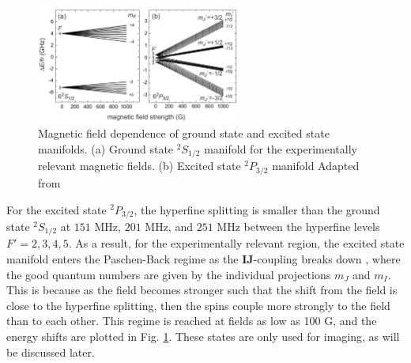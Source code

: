 \documentclass[prl,onecolumn,amsmath,amssymb,titlepage,nofootinbib,preprint]{revtex4-1}
\begin{document}

\begin{figure}
	\includegraphics[width=0.6\textwidth]{Figures/Zeeman_splitting}
	\caption{Magnetic field dependence of ground state and excited state manifolds. (a) Ground state $^{2}S_{1/2}$ manifold for the experimentally relevant magnetic fields.  (b) Excited state $^{2}P_{3/2}$ manifold Adapted from \cite{Berninger2011}}
	\label{fig:Zeeman_splitting}
\end{figure}

For the excited state $^{2}P_{3/2}$, the hyperfine splitting is smaller than the ground state $^{2}S_{1/2}$ at $151$ MHz, $201$ MHz, and $251$ MHz between the hyperfine levels $F'=2,3,4,5$.  As a result, for the experimentally relevant region, the excited state manifold enters the Paschen-Back regime as the \textbf{IJ}-coupling breaks down \cite{Berninger2011_thesis}, where the good quantum numbers are given by the individual projections $m_{J}$ and $m_{I}$. This is because as the field becomes stronger such that the shift from the field is close to the hyperfine splitting, then the spins couple more strongly to the field than to each other.  This regime is reached at fields as low as 100 G, and the energy shifts are plotted in Fig. \ref{fig:Zeeman_splitting}.  These states are only used for imaging, as will be discussed later.
\end{document}
